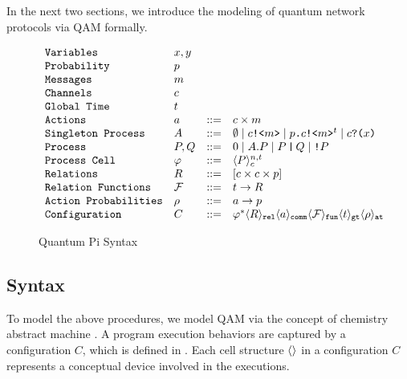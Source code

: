 In the next two sections, we introduce the modeling of quantum network protocols via QAM formally.

\begin{figure}[t]
{\small
  \[\begin{array}{llcl} 
      \texttt{Variables} & x,y \\
      \texttt{Probability} & p\\
      \texttt{Messages} & m\\
    \texttt{Channels} & c\\
    \texttt{Global Time} & t\\
    \texttt{Actions} & a & ::= & c \times m\\
      \texttt{Singleton Process} & A & ::= & \emptyset  \mid c\texttt{!<}m\texttt{>} \mid p\texttt{.}c\texttt{!<}m\texttt{>}^t \mid c\texttt{?(}x\texttt{)} \\
      \texttt{Process} & P,Q & ::= & 0 \mid A.P \mid P\,\texttt{|}\,Q \mid \texttt{!}P \\
      \texttt{Process Cell} & \varphi & ::= & \langle P \rangle^{n,t}_{c} \\
      \texttt{Relations} & R & ::= & [c \times c \times p] \\
      \texttt{Relation Functions} & \mathcal{F} & ::= & t \to R\\
    \texttt{Action Probabilities} & \rho & ::=& a \to p\\
      \texttt{Configuration} & C & ::= & \varphi^* \langle R \rangle_{\texttt{rel}}\langle a \rangle_{\texttt{comm}}\langle \mathcal{F} \rangle_{\texttt{fun}}\langle t \rangle_{\texttt{gt}}\langle \rho \rangle_{\texttt{at}}
    \end{array}
  \]
}
\caption{Quantum Pi Syntax}
  \label{fig:q-pi-syntax}
\end{figure}


\subsection{Syntax} \label{sec:qamsyntax}

To model the above procedures, we model QAM via the concept of chemistry abstract machine \cite{BERRY1992217}.
A program execution behaviors are captured by a configuration $C$, which is defined in .
Each cell structure $\langle  \rangle$ in a configuration $C$ represents a conceptual device involved in the executions.

